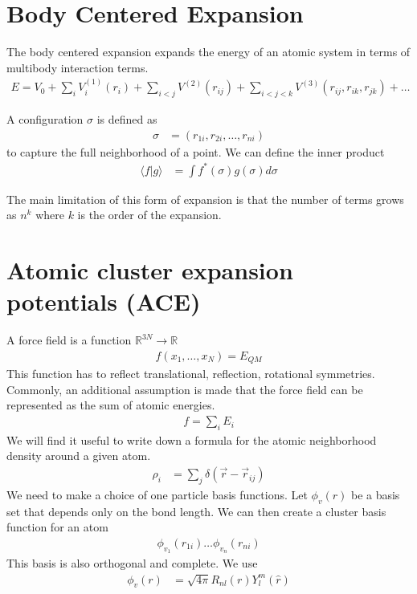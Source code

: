 \documentclass[book.tex]{subfiles}
\begin{document}
\section{Body Centered Expansion}

The body centered expansion expands the energy of an atomic system in terms of multibody interaction terms.
\begin{align}
    E = V_0 + \sum_i V^{(1)}_i(r_i) + \sum_{i < j} V^{(2)}(r_{ij}) + \sum_{i < j < k} V^{(3)}(r_{ij}, r_{ik}, r_{jk}) + \dotsc
\end{align}

A configuration $\sigma$ is defined as
\begin{align}
\sigma &= (r_{1i}, r_{2i},\dotsc,r_{ni})
\end{align}
to capture the full neighborhood of a point. We can define the inner product
\begin{align}
\langle f | g \rangle &= \int f^*(\sigma) g(\sigma) d\sigma
\end{align}


The main limitation of this form of expansion is that the number of terms grows as $n^k$ where $k$ is the order of the expansion.

\section{Atomic cluster expansion potentials (ACE)}

A force field is a function $\mathbb{R}^{3N} \to \mathbb{R}$
\begin{align}
f(x_1,\dotsc,x_N) = E_{QM}
\end{align}
This function has to reflect translational, reflection, rotational symmetries. Commonly, an additional assumption is made that the force field can be represented as the sum of atomic energies.
\begin{align}
    f= \sum_i E_i
\end{align}
We will find it useful to write down a formula for the atomic neighborhood density around a given atom. 
\begin{align}
    \rho_i &= \sum_j \delta(\vec{r} - \vec{r}_{ij})
\end{align}
We need to make a choice of one particle basis functions. 
Let $\phi_v(r)$ be a basis set that depends only on the bond length. We can then create a cluster basis function for an atom
\begin{align}
\phi_{v_1}(r_{1i})\dotsc \phi_{v_n}(r_{ni})
\end{align}
This basis is also orthogonal and complete.
We use
\begin{align}
\phi_v(r) &= \sqrt{4\pi} R_{nl}(r) Y^m_l(\hat{r})
\end{align}
\end{document}
